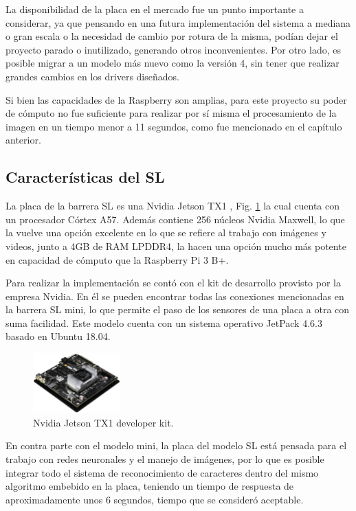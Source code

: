 La disponibilidad de la placa en el mercado fue un punto importante a considerar, ya que pensando en una futura
implementación del sistema a mediana o gran escala o la necesidad de cambio por rotura de la misma, podían dejar el
proyecto parado o inutilizado, generando otros inconvenientes. Por otro lado, es posible migrar a un modelo más nuevo como la versión 4, sin tener que realizar grandes cambios en los drivers diseñados.

Si bien las capacidades de la Raspberry son amplias, para este proyecto su poder de cómputo no fue suficiente para realizar por sí misma el procesamiento de la imagen en un tiempo menor a 11 segundos, como fue mencionado en el capítulo anterior.

\subsection{Características del SL}

La placa de la barrera SL es una Nvidia Jetson TX1 \cite{nvidia_manual_nodate}, Fig. \ref{fig:JTX1} la cual cuenta con un procesador Córtex A57. Además contiene 256 núcleos Nvidia Maxwell, lo que la vuelve una opción excelente en lo que se refiere al trabajo con imágenes y videos, junto a 4GB de RAM LPDDR4, la hacen una opción mucho más potente en capacidad de cómputo que la Raspberry Pi 3 B+.

Para realizar la implementación se contó con el kit de desarrollo provisto por la empresa Nvidia. En él se pueden encontrar todas las conexiones mencionadas en la barrera SL mini, lo que permite el paso de los sensores de una placa a otra con suma facilidad.
Este modelo cuenta con un sistema operativo JetPack 4.6.3 basado en Ubuntu 18.04.

\begin{figure}[bth]
    \centering
    \includegraphics[width=0.3\textwidth]{imgs/JTX1-developerkit.png}
    \caption{Nvidia Jetson TX1 developer kit.}
    \label{fig:JTX1}
\end{figure}


En contra parte con el modelo mini, la placa del modelo SL está pensada para el trabajo con redes neuronales y el manejo de imágenes, por lo que es posible integrar todo el sistema de reconocimiento de caracteres dentro del mismo algoritmo embebido en la placa, teniendo un tiempo de respuesta de aproximadamente unos 6 segundos, tiempo que se consideró aceptable.

